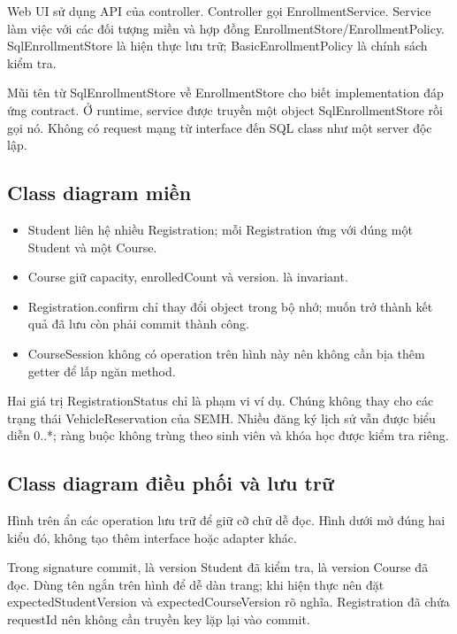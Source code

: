 Web UI sử dụng API của controller. Controller gọi EnrollmentService. Service làm việc với các đối tượng miền và hợp đồng EnrollmentStore/EnrollmentPolicy. SqlEnrollmentStore là hiện thực lưu trữ; BasicEnrollmentPolicy là chính sách kiểm tra.

Mũi tên từ SqlEnrollmentStore về EnrollmentStore cho biết implementation đáp ứng contract. Ở runtime, service được truyền một object SqlEnrollmentStore rồi gọi nó. Không có request mạng từ interface đến SQL class như một server độc lập.

\subsection{Class diagram miền}

\begin{itemize}
  \item Student liên hệ nhiều Registration; mỗi Registration ứng với đúng một Student và một Course.
  \item Course giữ capacity, enrolledCount và version.  là invariant.
  \item Registration.confirm chỉ thay đổi object trong bộ nhớ; muốn trở thành kết quả đã lưu còn phải commit thành công.
  \item CourseSession không có operation trên hình này nên không cần bịa thêm getter để lấp ngăn method.
\end{itemize}

Hai giá trị RegistrationStatus chỉ là phạm vi ví dụ. Chúng không thay cho các trạng thái VehicleReservation của SEMH. Nhiều đăng ký lịch sử vẫn được biểu diễn 0..*; ràng buộc không trùng theo sinh viên và khóa học được kiểm tra riêng.

\subsection{Class diagram điều phối và lưu trữ}

Hình trên ẩn các operation lưu trữ để giữ cỡ chữ dễ đọc. Hình dưới mở đúng hai kiểu đó, không tạo thêm interface hoặc adapter khác.


Trong signature commit,  là version Student đã kiểm tra,  là version Course đã đọc. Dùng tên ngắn trên hình để dễ dàn trang; khi hiện thực nên đặt expectedStudentVersion và expectedCourseVersion rõ nghĩa. Registration đã chứa requestId nên không cần truyền key lặp lại vào commit.

